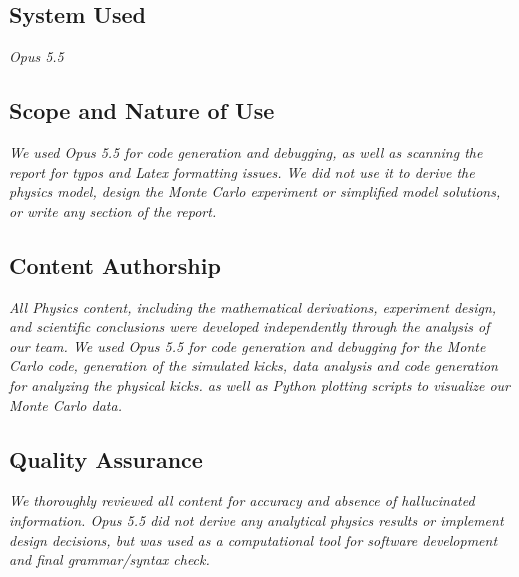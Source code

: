 \documentclass[10pt,a4paper]{article}
\begin{document}
\subsection*{System Used}
\textit{Opus 5.5}

\subsection*{Scope and Nature of Use}
\textit{We used Opus 5.5 for code generation and debugging, as well as scanning the report for typos and Latex formatting issues. We did not use it to derive the physics model, design the Monte Carlo experiment or simplified model solutions, or write any section of the report.}

\subsection*{Content Authorship}
\textit{All Physics content, including the mathematical derivations, experiment design, and scientific conclusions were developed independently through the analysis of our team. We used Opus 5.5 for code generation and debugging for the Monte Carlo code, generation of the simulated kicks, data analysis and code generation for analyzing the physical kicks. as well as Python plotting scripts to visualize our Monte Carlo data.}

\subsection*{Quality Assurance}
\textit{We thoroughly reviewed all content for accuracy and absence of hallucinated information. Opus 5.5 did not derive any analytical physics results or implement design decisions, but was used as a computational tool for software development and final grammar/syntax check.}
\end{document}
